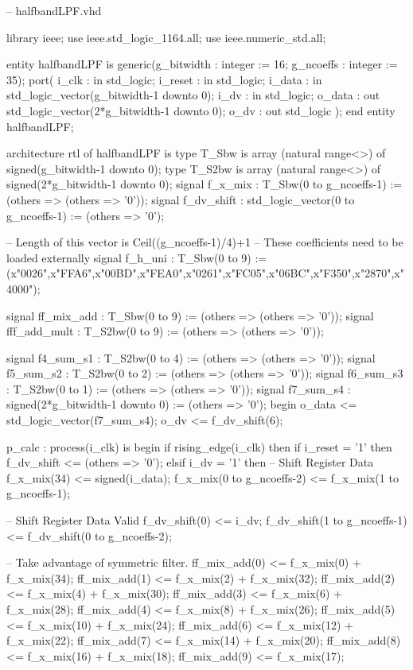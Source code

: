 \begin{VHDLlisting}[tabsize=2]
-- halfbandLPF.vhd

library ieee;
	use ieee.std_logic_1164.all;
	use ieee.numeric_std.all;
	
entity halfbandLPF is 
	generic(g_bitwidth : integer := 16;
	        g_ncoeffs  : integer := 35);
	port(
			i_clk      : in    std_logic;
			i_reset    : in    std_logic;
			i_data     : in    std_logic_vector(g_bitwidth-1 downto 0);
			i_dv       : in    std_logic;
			o_data     :   out std_logic_vector(2*g_bitwidth-1 downto 0);
			o_dv       :   out std_logic	
	);
end entity halfbandLPF;

architecture rtl of halfbandLPF is 
	type T_Sbw is array (natural range<>) of signed(g_bitwidth-1 downto 0);
	type T_S2bw is array (natural range<>) of signed(2*g_bitwidth-1 downto 0);
	signal f_x_mix    : T_Sbw(0 to g_ncoeffs-1) := (others => (others => '0'));
	signal f_dv_shift : std_logic_vector(0 to g_ncoeffs-1) := (others => '0');
	
	-- Length of this vector is Ceil((g_ncoeffs-1)/4)+1
	-- These coefficients need to be loaded externally
	signal f_h_uni      : T_Sbw(0 to 9) := (x"0026",x"FFA6",x"00BD",x"FEA0",x"0261",x"FC05",x"06BC",x"F350",x"2870",x"4000");

	signal ff_mix_add   : T_Sbw(0 to 9) := (others => (others => '0'));
	signal fff_add_mult : T_S2bw(0 to 9) := (others => (others => '0'));
	
	signal f4_sum_s1    : T_S2bw(0 to 4) := (others => (others => '0'));
	signal f5_sum_s2    : T_S2bw(0 to 2) := (others => (others => '0'));
	signal f6_sum_s3    : T_S2bw(0 to 1) := (others => (others => '0'));
	signal f7_sum_s4    : signed(2*g_bitwidth-1 downto 0) := (others => '0');
begin
	o_data <= std_logic_vector(f7_sum_s4);
	o_dv <= f_dv_shift(6);

	p_calc : process(i_clk) is
	begin
		if rising_edge(i_clk) then
			if i_reset = '1' then
				f_dv_shift <= (others => '0');
			elsif i_dv = '1' then
				-- Shift Register Data
				f_x_mix(34) <= signed(i_data);
				f_x_mix(0 to g_ncoeffs-2) <= f_x_mix(1 to g_ncoeffs-1);
				
				-- Shift Register Data Valid
				f_dv_shift(0) <= i_dv;
				f_dv_shift(1 to g_ncoeffs-1) <= f_dv_shift(0 to g_ncoeffs-2);
				
				-- Take advantage of symmetric filter. 
				ff_mix_add(0) <= f_x_mix(0) + f_x_mix(34);
				ff_mix_add(1) <= f_x_mix(2) + f_x_mix(32);
				ff_mix_add(2) <= f_x_mix(4) + f_x_mix(30);
				ff_mix_add(3) <= f_x_mix(6) + f_x_mix(28);
				ff_mix_add(4) <= f_x_mix(8) + f_x_mix(26);
				ff_mix_add(5) <= f_x_mix(10) + f_x_mix(24);
				ff_mix_add(6) <= f_x_mix(12) + f_x_mix(22);
				ff_mix_add(7) <= f_x_mix(14) + f_x_mix(20);
				ff_mix_add(8) <= f_x_mix(16) + f_x_mix(18);
				ff_mix_add(9) <= f_x_mix(17);
				

\end{VHDLlisting}
